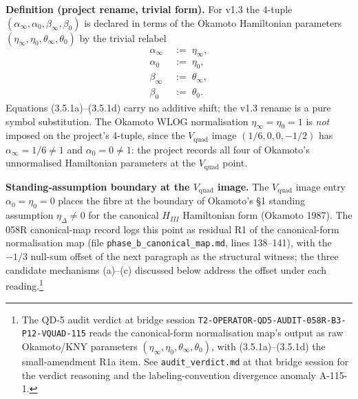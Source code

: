 \documentclass[11pt,reqno]{amsart}
\theoremstyle{plain}
\theoremstyle{definition}
\theoremstyle{remark}
\newcommand{\Vquad}{V_{\mathrm{quad}}}
\begin{document}
\medskip
\noindent\textbf{Definition (project rename, trivial form).}%
\hspace{0.5em}
For v1.3 the 4-tuple
$(\alpha_\infty, \alpha_0, \beta_\infty, \beta_0)$ is declared
in terms of the Okamoto Hamiltonian parameters
$(\eta_\infty, \eta_0, \theta_\infty, \theta_0)$ by the
trivial relabel
\begin{align}
  \alpha_\infty   &\;:=\; \eta_\infty,
                                           \tag{3.5.1a}\\
  \alpha_0        &\;:=\; \eta_0,
                                           \tag{3.5.1b}\\
  \beta_\infty    &\;:=\; \theta_\infty,
                                           \tag{3.5.1c}\\
  \beta_0         &\;:=\; \theta_0.
                                           \tag{3.5.1d}
\end{align}
Equations (3.5.1a)--(3.5.1d) carry no additive shift; the
v1.3 rename is a pure symbol substitution. The Okamoto WLOG
normalisation $\eta_\infty = \eta_0 = 1$ is {\em not} imposed
on the project's 4-tuple, since the $\Vquad$ image
$(1/6, 0, 0, -1/2)$ has $\alpha_\infty = 1/6 \ne 1$ and
$\alpha_0 = 0 \ne 1$: the project records all four of
Okamoto's unnormalised Hamiltonian parameters at the
$\Vquad$ point.

\medskip
\noindent\textbf{Standing-assumption boundary at the $\Vquad$
image.}\hspace{0.5em}
The $\Vquad$ image entry $\alpha_0 = \eta_0 = 0$ places the
fibre at the boundary of Okamoto's \S 1 standing assumption
$\eta_\Delta \neq 0$ for the canonical $H_{III}$
Hamiltonian form (Okamoto 1987). The 058R canonical-map
record \cite{siarc_cc_pipeline_g} logs this point as
residual R1 of the canonical-form normalisation map (file
\verb|phase_b_canonical_map.md|, lines 138--141), with the
$-1/3$ null-sum offset of the next paragraph as the
structural witness; the three candidate mechanisms (a)--(c)
discussed below address the offset under each
reading.\footnote{The QD-5 audit verdict at bridge session
\texttt{T2-OPERATOR-QD5-AUDIT-058R-B3-P12-VQUAD-115} reads
the canonical-form normalisation map's output as raw
Okamoto/KNY parameters
$(\eta_\infty, \eta_0, \theta_\infty, \theta_0)$, with
(3.5.1a)--(3.5.1d) the small-amendment R1a item. See
\texttt{audit\_verdict.md} at that bridge session for the
verdict reasoning and the labeling-convention divergence
anomaly A-115-1.}
\end{document}

